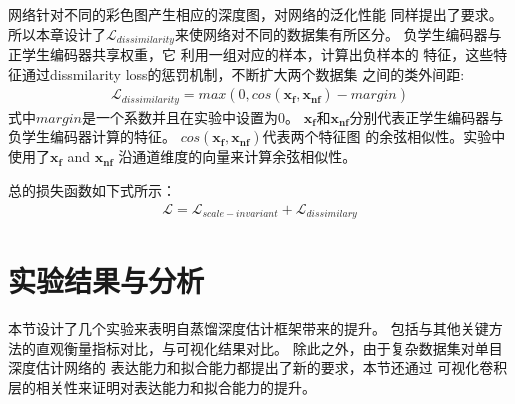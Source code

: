 网络针对不同的彩色图产生相应的深度图，对网络的泛化性能
同样提出了要求。所以本章设计了$\mathcal{L}_
{dissimilarity}$来使网络对不同的数据集有所区分。
负学生编码器与正学生编码器共享权重，它
利用一组对应的样本，计算出负样本的
特征，这些特征通过dissmilarity loss的惩罚机制，不断扩大两个数据集
之间的类外间距: 
\begin{align}
  \mathcal{L}_{dissimilarity}=max(0,cos(\mathbf{x_f}, \mathbf{x_{nf}}) - margin)
\end{align} 
式中$margin$是一个系数并且在实验中设置为0。
$\mathbf{x_{f}}$和$\mathbf{x_{nf}}$分别代表正学生编码器与
负学生编码器计算的特征。
$cos(\mathbf{x_f}, \mathbf{x_{nf}})$代表两个特征图
的余弦相似性。实验中使用了$\mathbf{x_{f}}$ and $\mathbf{x_{nf}}$
沿通道维度的向量来计算余弦相似性。 

总的损失函数如下式所示：
\begin{align}
\mathcal{L} = \mathcal{L}_{scale-invariant} + \mathcal{L}_{dissimilary}
\end{align}

\section{实验结果与分析}
本节设计了几个实验来表明自蒸馏深度估计框架带来的提升。
包括与其他关键方法的直观衡量指标对比，与可视化结果对比。
除此之外，由于复杂数据集对单目深度估计网络的
表达能力和拟合能力都提出了新的要求，本节还通过
可视化卷积层的相关性来证明对表达能力和拟合能力的提升。

